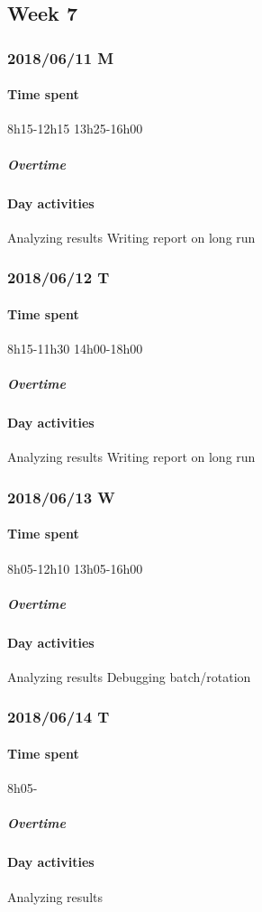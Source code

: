 \subsection{Week 7}
\subsubsection{2018/06/11 M}
\paragraph{Time spent}
{8h15}-{12h15}
{13h25}-{16h00}

\subparagraph{Overtime}


\paragraph{Day activities}
Analyzing results
Writing report on long run

\subsubsection{2018/06/12 T}
\paragraph{Time spent}
{8h15}-{11h30}
{14h00}-{18h00}

\subparagraph{Overtime}


\paragraph{Day activities}
Analyzing results
Writing report on long run

\subsubsection{2018/06/13 W}
\paragraph{Time spent}
{8h05}-{12h10}
{13h05}-{16h00}

\subparagraph{Overtime}


\paragraph{Day activities}
Analyzing results
Debugging batch/rotation

\subsubsection{2018/06/14 T}
\paragraph{Time spent}
{8h05}-

\subparagraph{Overtime}


\paragraph{Day activities}
Analyzing results
